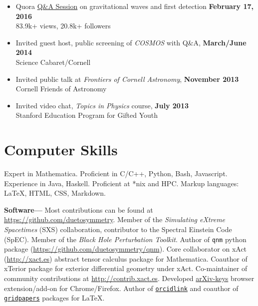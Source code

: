 \documentclass[margin,line]{res}
\begin{document}
\begin{resume}
\begin{itemize}
		\item[] Quora \href{https://www.quora.com/session/Leo-C-Stein/1}{Q\&A Session} on gravitational waves and first detection
		      \hfill {\bf February 17, 2016} \\
		      \hspace*{1em} 83.9k+ views, 20.8k+ followers

		\item[] Invited guest host, public screening of {\it COSMOS} with Q\&A,
		      \hfill {\bf March/June 2014} \\
		      \hspace*{1em} Science Cabaret/Cornell
		\item[] Invited public talk at {\it Frontiers of Cornell Astronomy}, \hfill {\bf November 2013} \\
		      \hspace*{1em} Cornell Friends of Astronomy
		\item[] Invited video chat, {\it Topics in Physics} course, \hfill {\bf July 2013} \\
		      \hspace*{1em} Stanford Education Program for Gifted Youth
	\end{itemize}

	\section{\sc Computer Skills}
	Expert in {\sc Mathematica}.
	Proficient in C/C++, Python, Bash, Javascript.
	Experience in Java, Haskell.
	Proficient at *nix and HPC.
	Markup languages: \LaTeX, HTML, CSS, Markdown.


		{\bf Software---}%
	Most contributions can be found at \url{https://github.com/duetosymmetry}.
	Member of the {\it Simulating eXtreme Spacetimes} (SXS) collaboration,
	contributor to the Spectral Einstein Code (SpEC).
	Member of the {\it Black Hole Perturbation Toolkit}. Author of
		{\tt qnm} python package (\url{https://github.com/duetosymmetry/qnm}).
	Core collaborator on {\sc xAct} (\url{http://xact.es}) abstract
	tensor calculus package for {\sc  Mathematica}. Coauthor
	of {\sc xTerior} package for exterior differential geometry under
		{\sc xAct}. Co-maintainer of community contributions at
	\url{http://contrib.xact.es}. Developed
	\href{https://chrome.google.com/webstore/detail/arxiv-keys/fkjjdlbhliopfhgddlpoggpmpgjfaojd}{arXiv-keys}
	browser extension/add-on for Chrome/Firefox.
	Author of \href{https://ctan.org/pkg/orcidlink}{\tt orcidlink} and coauthor of \href{https://ctan.org/pkg/gridpapers}{\tt gridpapers} packages for \LaTeX.


\end{resume}
\end{document}
